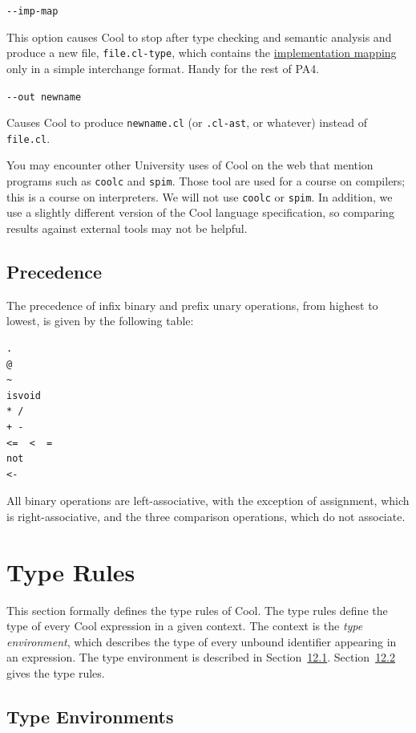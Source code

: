 \documentclass[]{article}
\begin{document}
\texttt{-{}-imp-map}

This option causes Cool to stop after type checking and semantic
analysis and produce a new file, \texttt{file.cl-type}, which contains
the \href{node47.html}{implementation mapping} only in a simple
interchange format. Handy for the rest of PA4.

\texttt{-{}-out newname}

Causes Cool to produce \texttt{newname.cl} (or \texttt{.cl-ast}, or
whatever) instead of \texttt{file.cl}.

You may encounter other University uses of Cool on the web that mention
programs such as \texttt{coolc} and \texttt{spim}. Those tool are used
for a course on compilers; this is a course on interpreters. We will not
use \texttt{coolc} or \texttt{spim}. In addition, we use a slightly
different version of the Cool language specification, so comparing
results against external tools may not be helpful.

\subsection{Precedence}

The precedence of infix binary and prefix unary operations, from highest
to lowest, is given by the following table:

\begin{verbatim}
.
@
~
isvoid
* /
+ -
<=  <  =
not
<-
\end{verbatim}

All binary operations are left-associative, with the exception of
assignment, which is right-associative, and the three comparison
operations, which do not associate.

\section{Type Rules}

This section formally defines the type rules of Cool. The type rules
define the type of every Cool expression in a given context. The context
is the \emph{type environment}, which describes the type of every
unbound identifier appearing in an expression. The type environment is
described in Section~\href{node42.html\#sec-typenv}{12.1}.
Section~\href{node43.html\#sec-typr}{12.2} gives the type rules.

\subsection{Type Environments}
\end{document}
